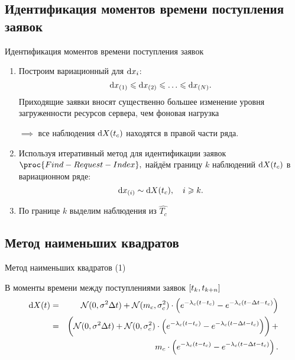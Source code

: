 \documentclass[utf8]{beamer}
\begin{document}
\subsection{Идентификация моментов времени поступления заявок}
\begin{frame}{Идентификация моментов времени поступления заявок}
\begin{enumerate}
\item Построим вариационный для $\dif x_i$:
  $$\dif x_{(1)} \leqslant \dif x_{(2)} \leqslant \ldots 
    \leqslant \dif x_{(N)}.$$
  Приходящие заявки вносят существенно большее изменение уровня загруженности
  ресурсов сервера, чем фоновая нагрузка

  $\implies$ все наблюдения $\dif X(t_c)$ находятся в правой части ряда.

\item Используя итеративный метод для идентификации заявок 
$\proc{Find-Request-Index},$
найдём границу $k$ наблюдений $\dif X(t_c)$ в вариационном ряде:
$$
  \dif x_{(i)} \sim \dif X(t_c), \quad i \geqslant k.
$$

\item По границе $k$ выделим наблюдения из $\widehat{T_c}$
\end{enumerate}
\end{frame}


\subsection[МНК]{Метод наименьших квадратов}
\begin{frame}{Метод наименьших квадратов (1)}
\begin{block}{В моменты времени между поступлениями заявок $\sbr{t_k, t_{k+n}}$}
\begin{eqnarray*}
\dif X(t) 
  & = & \mathcal{N}(0, \sigma^2 \Delta t) + 
      \mathcal{N}(m_c, \sigma_c^2) \cdot 
        \del{e^{-\lambda_c(t - t_c)} - e^{-\lambda_c(t - \Delta t - t_c)}} \\
  & = & \del{
      \mathcal{N}(0, \sigma^2 \Delta t) + 
      \mathcal{N}(0, \sigma_c^2) \cdot 
        \del{e^{-\lambda_c(t - t_c)} - e^{-\lambda_c(t - \Delta t - t_c)}}} +\\
      && m_c \cdot 
        \del{e^{-\lambda_c(t - t_c)} - e^{-\lambda_c(t - \Delta t - t_c)}}.
\end{eqnarray*}
\end{block}
\end{frame}
\end{document}
